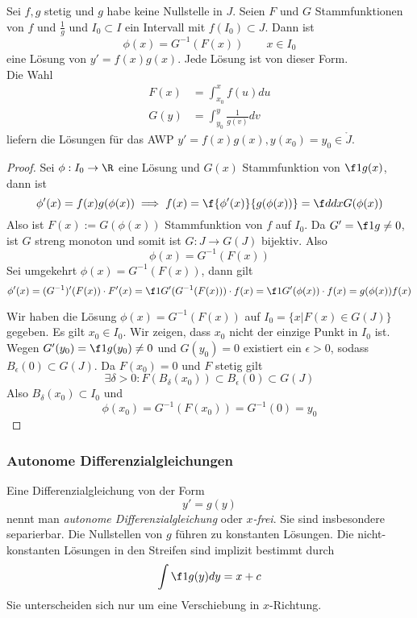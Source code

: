 \documentclass[a4paper,10pt]{scrartcl}
\begin{document}
\begin{st}
	Sei $f,g$ stetig und $g$ habe keine Nullstelle in $J$. Seien $F$ und $G$ Stammfunktionen von
	$f$ und $\frac{1}{g}$ und $I_0\subset I$ ein Intervall mit $f(I_0)\subset J$. Dann ist
	\[
	\phi(x)=G^{-1}(F(x)) \qquad x\in I_0
	\]
	eine Lösung von $y'=f(x)g(x)$. Jede Lösung ist von dieser Form.\\
	Die Wahl 
	\begin{align*}
		F(x)&=\int_{x_0}^xf(u)du\\
	 G(y)&=\int_{y_0}^y\frac{1}{g(v)}dv
	\end{align*}
	liefern die Lösungen für das AWP $y'=f(x)g(x), y(x_0)=y_0 \in \mathring J$.
	\begin{proof}
		Sei $\phi : I_0 \to \R$ eine Lösung und $G(x)$ Stammfunktion von $\f 1{g(x)}$, dann ist
		\[
			\phi'(x) = f(x)g(\phi(x)) \implies f(x) = \f {\phi'(x)}{g(\phi(x))} = \f d{dx} G(\phi(x))
		\]
		Also ist $F(x) := G(\phi(x))$ Stammfunktion von $f$ auf $I_0$.
		Da $G' = \f 1g \neq 0$, ist $G$ streng monoton und somit ist $G: J\to G(J)$ bijektiv.
		Also
		\[
			\phi(x) = G^{-1}(F(x))
		\]
		Sei umgekehrt $\phi(x) = G^{-1}(F(x))$, dann gilt
		\[
			\phi'(x) = (G^{-1})'(F(x))\cdot F'(x) = \f 1{G'(G^{-1}(F(x)))} \cdot f(x) = \f 1 {G'(\phi(x))} \cdot f(x) = g(\phi(x))f(x)
		\]

		Wir haben die Lösung $\phi(x) = G^{-1}(F(x))$ auf $I_0 = \{x\big| F(x)\in G(J)\}$ gegeben.
		Es gilt $x_0\in I_0$.
		Wir zeigen, dass $x_0$ nicht der einzige Punkt in $I_0$ ist.
		Wegen $G'(y_0) = \f 1 {g(y_0)}\neq 0$ und $G(y_0) = 0$ existiert ein $\epsilon > 0$, sodass $B_\epsilon(0) \subset G(J)$.
		Da $F(x_0) = 0$ und $F$ stetig gilt
		\[
			\exists \delta > 0 : F(B_\delta(x_0)) \subset B_\epsilon(0) \subset G(J)
		\]
		Also $B_\delta(x_0) \subset I_0$  und
		\[
			\phi(x_0) = G^{-1}(F(x_0)) = G^{-1}(0) = y_0
		\]
	\end{proof}
\end{st}

\subsubsection{Autonome Differenzialgleichungen}

\begin{df*}
	Eine Differenzialgleichung von der Form
	\[
		y'=g(y)
	\]
	nennt man \emph{autonome Differenzialgleichung} oder \emph{$x$-frei}.
	Sie sind insbesondere separierbar.
	Die Nullstellen von $g$ führen zu konstanten Lösungen.
	Die nicht-konstanten Lösungen in den Streifen sind implizit bestimmt durch
	\[
		\int \f 1{g(y)}dy = x + c
	\]
	Sie unterscheiden sich nur um eine Verschiebung in $x$-Richtung.
\end{df*}
\end{document}
